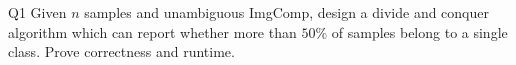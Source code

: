 \begin{problem}
  {Q1}
  Given $n$ samples and unambiguous ImgComp, design a divide and conquer algorithm which can report whether more than
  $50\%$ of samples belong to a single class. Prove correctness and runtime. \\
\end{problem}
